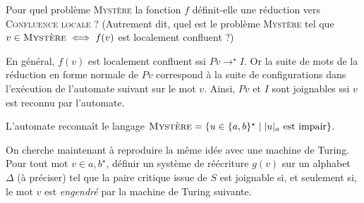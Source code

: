 \begin{exercice}
  \ifcorrection{\pagebreak}
  \begin{question}
  \item 
    Pour quel problème \textsc{Mystère} la fonction $f$ définit-elle une réduction vers
    \textsc{Confluence locale} ?  
    (Autrement dit, quel est le problème \textsc{Mystère} tel que
    $v\in \textsc{Mystère} \iff f(v)$ est localement confluent ?)
  \end{question}
  \begin{correction}
    En général, $f(v)$ est localement confluent ssi $Pv\to^\star I$. 
    Or la suite de mots de la réduction en forme normale de $Pv$ correspond à la suite de configurations dans l'exécution de
    l'automate suivant sur le mot $v$. Ainsi, $Pv$ et $I$ sont joignables ssi $v$ est reconnu par l'automate. 
    \begin{center}
    \end{center}
    L'automate reconnaît le langage $\textsc{Mystère} = \{u \in \{a, b\}^\star \mid |u|_a \text{ est impair}\}$.
  \end{correction}
  
  \ifnotcorrection{\newpage}
  \begin{question}
  \item On cherche maintenant à reproduire la même idée avec une machine de Turing.
    Pour tout mot $v\in{a,b}^\star$, définir un système de réécriture $g(v)$ sur un alphabet
    $\Delta$ (à préciser) tel que la paire critique issue de $S$ est joignable si,
    et seulement si, le mot $v$ est \emph{engendré} par la machine de Turing suivante.

    \begin{center}
\end{center}
\end{question}
\end{exercice}
